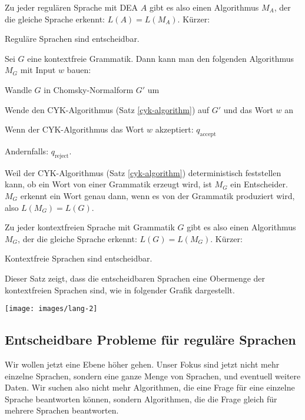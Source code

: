 Zu jeder regulären Sprache mit DEA $A$ gibt es also einen
Algorithmus $M_A$, der die gleiche Sprache erkennt: $L(A)=L(M_A)$.
Kürzer:

\begin{satz}
\label{regulaer-entscheidbar}
Reguläre Sprachen sind entscheidbar.
\end{satz}

\begin{beispiel}
Sei $G$ eine kontextfreie Grammatik.
Dann kann man den folgenden Algorithmus $M_G$ mit Input $w$ bauen:
\begin{compactenum}
\item Wandle $G$ in Chomsky-Normalform $G'$ um
\item Wende den CYK-Algorithmus (Satz \ref{cyk-algorithm}) auf $G'$ und das
Wort $w$ an
\item Wenn der CYK-Algorithmus das Wort $w$ akzeptiert: $q_{\text{accept}}$
\item Andernfalls: $q_{\text{reject}}$.
\end{compactenum}
Weil der CYK-Algorithmus (Satz \ref{cyk-algorithm}) deterministisch 
feststellen kann, ob ein Wort von einer Grammatik erzeugt wird, ist
$M_G$ ein Entscheider.
$M_G$ erkennt ein Wort genau dann, wenn es von
der Grammatik produziert wird, also $L(M_G)=L(G)$.
\end{beispiel}

Zu jeder kontextfreien Sprache mit Grammatik $G$ gibt es also einen 
Algorithmus $M_G$, der die gleiche Sprache erkennt: $L(G)=L(M_G)$.
Kürzer:

\begin{satz}
Kontextfreie Sprachen sind entscheidbar.
\end{satz}
Dieser Satz zeigt, dass die entscheidbaren Sprachen eine 
Obermenge der kontextfreien Sprachen sind, wie in folgender
Grafik dargestellt.
\begin{center}
\texttt{[image: images/lang-2]}
\end{center}

\subsection{Entscheidbare Probleme für reguläre Sprachen}
Wir wollen jetzt eine Ebene höher gehen.
Unser Fokus sind jetzt nicht
mehr einzelne Sprachen, sondern eine ganze Menge von Sprachen, und eventuell
weitere Daten.
Wir suchen also nicht mehr Algorithmen, die eine Frage
für eine einzelne Sprache beantworten können, sondern Algorithmen, die
die Frage gleich für mehrere Sprachen beantworten.

